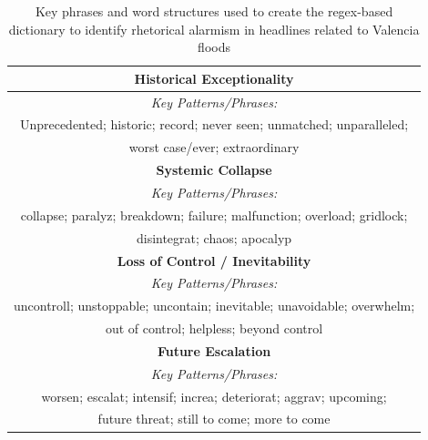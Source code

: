 \begin{table}
\centering
\begin{tabular}{c}
\toprule
\textbf{Historical Exceptionality} \\
\midrule 
\emph{Key Patterns/Phrases:} \\ 
Unprecedented; historic; record; never seen; unmatched; unparalleled; \\
 worst case/ever; extraordinary \\
\midrule 

\textbf{Systemic Collapse} \\ 
\midrule
\emph{Key Patterns/Phrases:} \\ 
collapse; paralyz; breakdown; failure; malfunction; overload; gridlock; \\
disintegrat; chaos; apocalyp \\
\midrule

\textbf{Loss of Control / Inevitability} \\ 
\midrule
\emph{Key Patterns/Phrases:} \\ 
uncontroll; unstoppable; uncontain; inevitable; unavoidable; overwhelm; \\
out of control; helpless; beyond control  \\
\midrule

\textbf{Future Escalation} \\ 
\midrule
\emph{Key Patterns/Phrases:} \\ 
worsen; escalat; intensif; increa; deteriorat; aggrav; upcoming; \\
future threat; still to come; more to come  \\
\midrule

\end{tabular}
\caption{Key phrases and word structures used to create the regex-based dictionary to identify rhetorical alarmism in headlines related to Valencia floods}
\label{tab:dict}
\end{table} 






